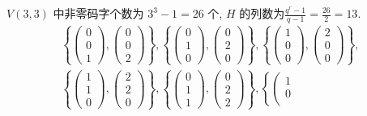 \begin{example}
 $ V(3,3) $ 中非零码字个数为 $ 3^{3}-1=26 $ 个, $ H $ 的列数为$\frac{q^{r}-1}{q-1}=\frac{26}{2}=13 .$
$$
\begin{array}{l}
\left\{\left(\begin{array}{l}
0 \\
0 \\
1
\end{array}\right),\left(\begin{array}{l}
0 \\
0 \\
2
\end{array}\right)\right\},\left\{\left(\begin{array}{l}
0 \\
1 \\
0
\end{array}\right),\left(\begin{array}{l}
0 \\
2 \\
0
\end{array}\right)\right\},\left\{\left(\begin{array}{l}
1 \\
0 \\
0
\end{array}\right),\left(\begin{array}{l}
2 \\
0 \\
0
\end{array}\right)\right\}, \\
\left\{\left(\begin{array}{l}
1 \\
1 \\
0
\end{array}\right),\left(\begin{array}{l}
2 \\
2 \\
0
\end{array}\right)\right\},\left\{\left(\begin{array}{l}
0 \\
1 \\
1
\end{array}\right),\left(\begin{array}{l}
0 \\
2 \\
2
\end{array}\right)\right\},\left\{\left(\begin{array}{l}
1 \\
0 \\

\end{array}
\end{array}$$
\end{example}
